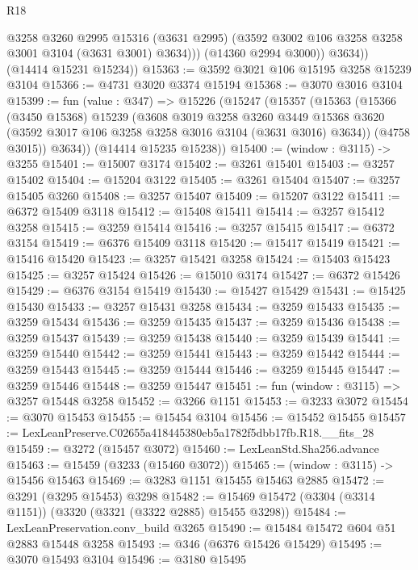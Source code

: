 \begin{lexlean}{R18}
\begin{coremodule}
                @3258
                @3260
                @2995
                @15316
                (@3631 @2995)
                (@3592 @3002 @106 @3258 @3258 @3001 @3104 (@3631 @3001) @3634)))
            (@14360 @2994 @3000))
          @3634))
      (@14414 @15231 @15234))
@15363 := @3592 @3021 @106 @15195 @3258 @15239 @3104
@15366 := @4731 @3020 @3374 @15194
@15368 := @3070 @3016 @3104
@15399 := fun (value : @347) =>
  @15226
    (@15247
      (@15357
        (@15363
          (@15366
            (@3450 @15368)
            @15239
            (@3608
              @3019
              @3258
              @3260
              @3449
              @15368
              @3620
              (@3592 @3017 @106 @3258 @3258 @3016 @3104 (@3631 @3016) @3634))
            (@4758 @3015))
          @3634))
      (@14414 @15235 @15238))
@15400 := (window : @3115) -> @3255
@15401 := @15007 @3174
@15402 := @3261 @15401
@15403 := @3257 @15402
@15404 := @15204 @3122
@15405 := @3261 @15404
@15407 := @3257 @15405 @3260
@15408 := @3257 @15407
@15409 := @15207 @3122
@15411 := @6372 @15409 @3118
@15412 := @15408 @15411
@15414 := @3257 @15412 @3258
@15415 := @3259 @15414
@15416 := @3257 @15415
@15417 := @6372 @3154
@15419 := @6376 @15409 @3118
@15420 := @15417 @15419
@15421 := @15416 @15420
@15423 := @3257 @15421 @3258
@15424 := @15403 @15423
@15425 := @3257 @15424
@15426 := @15010 @3174
@15427 := @6372 @15426
@15429 := @6376 @3154 @15419
@15430 := @15427 @15429
@15431 := @15425 @15430
@15433 := @3257 @15431 @3258
@15434 := @3259 @15433
@15435 := @3259 @15434
@15436 := @3259 @15435
@15437 := @3259 @15436
@15438 := @3259 @15437
@15439 := @3259 @15438
@15440 := @3259 @15439
@15441 := @3259 @15440
@15442 := @3259 @15441
@15443 := @3259 @15442
@15444 := @3259 @15443
@15445 := @3259 @15444
@15446 := @3259 @15445
@15447 := @3259 @15446
@15448 := @3259 @15447
@15451 := fun (window : @3115) => @3257 @15448 @3258
@15452 := @3266 @1151
@15453 := @3233 @3072
@15454 := @3070 @15453
@15455 := @15454 @3104
@15456 := @15452 @15455
@15457 := LexLeanPreserve.C02655a418445380eb5a1782f5dbb17fb.R18.__fits_28
@15459 := @3272 (@15457 @3072)
@15460 := LexLeanStd.Sha256.advance
@15463 := @15459 (@3233 (@15460 @3072))
@15465 := (window : @3115) -> @15456 @15463
@15469 := @3283 @1151 @15455 @15463 @2885
@15472 := @3291 (@3295 @15453) @3298
@15482 := @15469 @15472 (@3304 (@3314 @1151)) (@3320 (@3321 (@3322 @2885) @15455 @3298))
@15484 := LexLeanPreservation.conv_build @3265
@15490 := @15484 @15472 @604 @51 @2883 @15448 @3258
@15493 := @346 (@6376 @15426 @15429)
@15495 := @3070 @15493 @3104
@15496 := @3180 @15495

\end{coremodule}
\end{lexlean}
